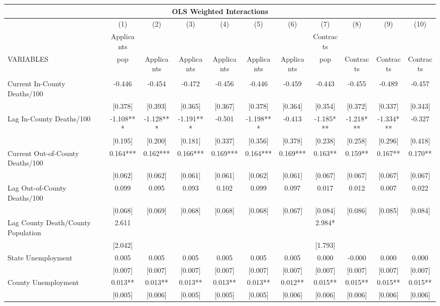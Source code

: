 \documentclass[]{article}
\begin{document}
\begin{tabular}{lcccccccccc}
\multicolumn{11}{c}{OLS Weighted Interactions} \\ \hline
 & (1) & (2) & (3) & (4) & (5) & (6) & (7) & (8) & (9) & (10) \\
 & Applicants &  &  &  &  &  & Contracts &  &  &  \\
VARIABLES & pop & Applicants & Applicants & Applicants & Applicants & Applicants & pop & Contracts & Contracts & Contracts \\ \hline
 &  &  &  &  &  &  &  &  &  &  \\
Current In-County Deaths/100 & -0.446 & -0.454 & -0.472 & -0.456 & -0.446 & -0.459 & -0.443 & -0.455 & -0.489 & -0.457 \\
 & [0.378] & [0.393] & [0.365] & [0.367] & [0.378] & [0.364] & [0.354] & [0.372] & [0.337] & [0.343] \\
Lag In-County Deaths/100 & -1.108*** & -1.128*** & -1.191*** & -0.501 & -1.198*** & -0.413 & -1.185*** & -1.218*** & -1.334*** & -0.327 \\
 & [0.195] & [0.200] & [0.181] & [0.337] & [0.356] & [0.378] & [0.238] & [0.258] & [0.296] & [0.418] \\
Current Out-of-County Deaths/100 & 0.164*** & 0.162*** & 0.166*** & 0.169*** & 0.164*** & 0.169*** & 0.163** & 0.159** & 0.167** & 0.170** \\
 & [0.062] & [0.062] & [0.061] & [0.061] & [0.062] & [0.061] & [0.067] & [0.067] & [0.067] & [0.067] \\
Lag Out-of-County Deaths/100 & 0.099 & 0.095 & 0.093 & 0.102 & 0.099 & 0.097 & 0.017 & 0.012 & 0.007 & 0.022 \\
 & [0.068] & [0.069] & [0.068] & [0.068] & [0.068] & [0.067] & [0.084] & [0.086] & [0.085] & [0.084] \\
Lag County Death/County Population & 2.611 &  &  &  &  &  & 2.984* &  &  &  \\
 & [2.042] &  &  &  &  &  & [1.793] &  &  &  \\
State Unemployment & 0.005 & 0.005 & 0.005 & 0.005 & 0.005 & 0.005 & 0.000 & -0.000 & 0.000 & 0.000 \\
 & [0.007] & [0.007] & [0.007] & [0.007] & [0.007] & [0.007] & [0.007] & [0.007] & [0.007] & [0.007] \\
County Unemployment & 0.013** & 0.013** & 0.013** & 0.013** & 0.013** & 0.012** & 0.015** & 0.015** & 0.015** & 0.015** \\
 & [0.005] & [0.006] & [0.005] & [0.005] & [0.005] & [0.006] & [0.006] & [0.006] & [0.006] & [0.006] \\

\end{tabular}
\end{document}
